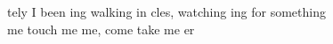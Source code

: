 tely I been ing walking in cles, watching ing for something \\
 me touch me  me, come take me er \songwordfb{}\\

